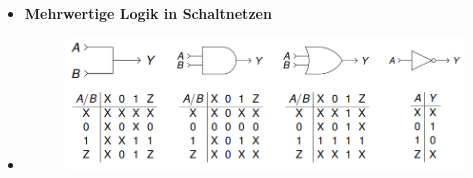 \documentclass[11pt,a4paper]{article}
\begin{document}
\begin{itemize}
\item \textbf{Mehrwertige Logik in Schaltnetzen}
\item[] \begin{figure}[H]
				\begin{center}
				\includegraphics[height=3.5cm]{Bilder/mehrTabelle}
				\end{center}
			\end{figure}


\end{itemize}
\end{document}
